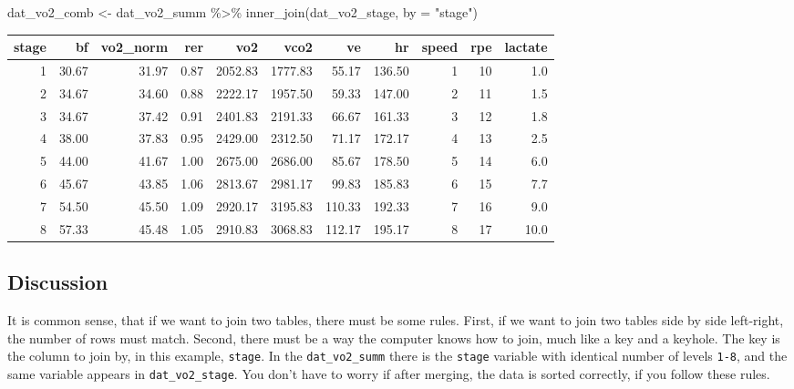 \documentclass[
]{book}
\newenvironment{Shaded}{\begin{snugshade}}{\end{snugshade}}
\newcommand{\AttributeTok}[1]{\textcolor[rgb]{0.77,0.63,0.00}{#1}}
\newcommand{\FunctionTok}[1]{\textcolor[rgb]{0.00,0.00,0.00}{#1}}
\newcommand{\NormalTok}[1]{#1}
\newcommand{\OtherTok}[1]{\textcolor[rgb]{0.56,0.35,0.01}{#1}}
\newcommand{\SpecialCharTok}[1]{\textcolor[rgb]{0.00,0.00,0.00}{#1}}
\newcommand{\StringTok}[1]{\textcolor[rgb]{0.31,0.60,0.02}{#1}}
\begin{document}
\begin{Shaded}
\begin{Highlighting}[]
\NormalTok{dat\_vo2\_comb }\OtherTok{\textless{}{-}}\NormalTok{ dat\_vo2\_summ }\SpecialCharTok{\%\textgreater{}\%}
  \FunctionTok{inner\_join}\NormalTok{(dat\_vo2\_stage, }\AttributeTok{by =} \StringTok{"stage"}\NormalTok{) }
\end{Highlighting}
\end{Shaded}

\begin{tabular}{r|r|r|r|r|r|r|r|r|r|r}
\hline
stage & bf & vo2\_norm & rer & vo2 & vco2 & ve & hr & speed & rpe & lactate\\
\hline
1 & 30.67 & 31.97 & 0.87 & 2052.83 & 1777.83 & 55.17 & 136.50 & 1 & 10 & 1.0\\
\hline
2 & 34.67 & 34.60 & 0.88 & 2222.17 & 1957.50 & 59.33 & 147.00 & 2 & 11 & 1.5\\
\hline
3 & 34.67 & 37.42 & 0.91 & 2401.83 & 2191.33 & 66.67 & 161.33 & 3 & 12 & 1.8\\
\hline
4 & 38.00 & 37.83 & 0.95 & 2429.00 & 2312.50 & 71.17 & 172.17 & 4 & 13 & 2.5\\
\hline
5 & 44.00 & 41.67 & 1.00 & 2675.00 & 2686.00 & 85.67 & 178.50 & 5 & 14 & 6.0\\
\hline
6 & 45.67 & 43.85 & 1.06 & 2813.67 & 2981.17 & 99.83 & 185.83 & 6 & 15 & 7.7\\
\hline
7 & 54.50 & 45.50 & 1.09 & 2920.17 & 3195.83 & 110.33 & 192.33 & 7 & 16 & 9.0\\
\hline
8 & 57.33 & 45.48 & 1.05 & 2910.83 & 3068.83 & 112.17 & 195.17 & 8 & 17 & 10.0\\
\hline
\end{tabular}

\hypertarget{discussion-7}{%
\subsection{Discussion}\label{discussion-7}}

It is common sense, that if we want to join two tables, there must be some rules. First, if we want to join two tables side by side left-right, the number of rows must match. Second, there must be a way the computer knows how to join, much like a key and a keyhole. The key is the column to join by, in this example, \texttt{stage}. In the \texttt{dat\_vo2\_summ} there is the \texttt{stage} variable with identical number of levels \texttt{1-8}, and the same variable appears in \texttt{dat\_vo2\_stage}. You don't have to worry if after merging, the data is sorted correctly, if you follow these rules.
\end{document}
